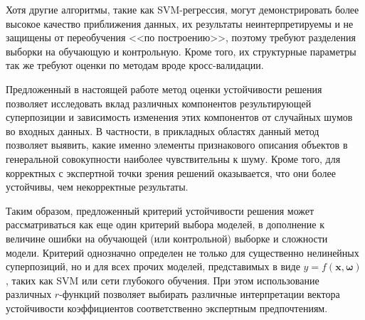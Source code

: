 \documentclass[12pt,a4paper]{article}
\begin{document}
Хотя другие алгоритмы, такие как SVM-регрессия, могут демонстрировать более высокое
качество приближения данных, их результаты неинтерпретируемы и не защищены от переобучения
<<по построению>>, поэтому требуют разделения выборки на обучающую и контрольную. Кроме
того, их структурные параметры так же требуют оценки по методам вроде кросс-валидации.

Предложенный в настоящей работе метод оценки устойчивости решения позволяет исследовать вклад различных
компонентов результирующей суперпозиции и зависимость изменения этих компонентов от
случайных шумов во входных данных. В частности, в прикладных областях данный метод позволяет
выявить, какие именно элементы признакового описания объектов в генеральной совокупности
наиболее чувствительны к шуму. Кроме того, для корректных с экспертной точки зрения
решений оказывается, что они более устойчивы, чем некорректные результаты.

Таким образом, предложенный критерий устойчивости решения может рассматриваться как еще
один критерий выбора моделей, в дополнение к величине ошибки на обучающей (или
контрольной) выборке и сложности модели. Критерий однозначно определен не только для существенно
нелинейных суперпозиций, но и для всех прочих моделей, представимых в виде
$y = f(\mathbf{x}, \boldsymbol{\omega})$, таких как SVM или сети глубокого обучения.
При этом использование различных $r$-функций
позволяет выбирать различные интерпретации вектора устойчивости коэффициентов соответственно
экспертным предпочтениям.

\FloatBarrier



\end{document}
